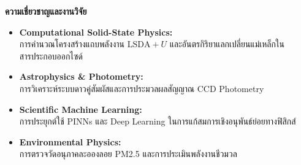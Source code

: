 \begin{minipage}[t]{0.48\textwidth}
    \textbf{\large ความเชี่ยวชาญและงานวิจัย}
    \begin{itemize}[leftmargin=1.2cm, itemsep=4pt]
        \item \textbf{Computational Solid-State Physics:}\\
        การคำนวณโครงสร้างแถบพลังงาน $\text{LSDA}+U$ และอันตรกิริยาแลกเปลี่ยนแม่เหล็กในสารประกอบออกไซด์
        \item \textbf{Astrophysics \& Photometry:}\\
        การวิเคราะห์ระบบดาวคู่สัมผัสและการประมวลผลสัญญาณ CCD Photometry
        \item \textbf{Scientific Machine Learning:}\\
        การประยุกต์ใช้ PINNs และ Deep Learning ในการแก้สมการเชิงอนุพันธ์ย่อยทางฟิสิกส์
        \item \textbf{Environmental Physics:}\\
        การตรวจวัดอนุภาคละอองลอย PM2.5 และการประเมินพลังงานชีวมวล
    \end{itemize}
\end{minipage}
